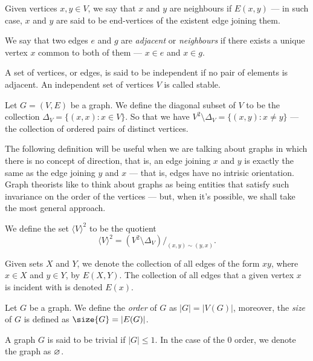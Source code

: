 \begin{definition}[Adjacency]
Given vertices \(x, y \in V\), we say that \(x\) and \(y\) are neighbours if
\(E(x, y)\) --- in such case, \(x\) and \(y\) are said to be end-vertices of the
existent edge joining them.

We say that two edges \(e\) and \(g\) are \emph{adjacent} or \emph{neighbours}
if there exists a unique vertex \(x\) common to both of them --- \(x \in e\)
and \(x \in g\).

A set of vertices, or edges, is said to be independent if no pair of elements
is adjacent. An independent set of vertices \(V\) is called stable.
\end{definition}

\begin{definition}
Let \(G = (V, E)\) be a graph. We define the diagonal subset of \(V\) to be
the collection \(\Delta_V = \{(x, x) : x \in V\}\). So that we have
\(V^2 \setminus \Delta_V = \{(x, y) : x \neq y\}\) --- the collection of
ordered pairs of distinct vertices.
\end{definition}

The following definition will be useful when we are talking about graphs in
which there is no concept of direction, that is, an edge joining \(x\) and \(y\)
is exactly the same as the edge joining \(y\) and \(x\) --- that is, edges have no
intrisic orientation. Graph theorists like to think about graphs as being
entities that satisfy such invariance on the order of the vertices --- but, when
it's possible, we shall take the most general approach.

\begin{definition}
We define the set \(\langle V \rangle^2\) to be the quotient
\[
  \langle V \rangle^2 = (V^2 \setminus \Delta_V)/_{(x, y) \sim (y, x)}.
\]
\end{definition}

\begin{notation}
Given sets \(X\) and \(Y\), we denote the collection of all edges of the form
\(xy\), where \(x \in X\) and \(y \in Y\), by \(E(X, Y)\). The collection of
all edges that a given vertex \(x\) is incident with is denoted \(E(x)\).
\end{notation}

\begin{definition}\label{def:graph-order-size}
Let \(G\) be a graph. We define the \emph{order} of \(G\) as \(|G| =|V(G)|\),
moreover, the \emph{size} of \(G\) is defined as \(\size{G} = |E(G)|\).
\end{definition}

\begin{definition}
A graph \(G\) is said to be trivial if \(|G| \leq 1\). In the case of the
\(0\) order, we denote the graph as \(\varnothing\).
\end{definition}
